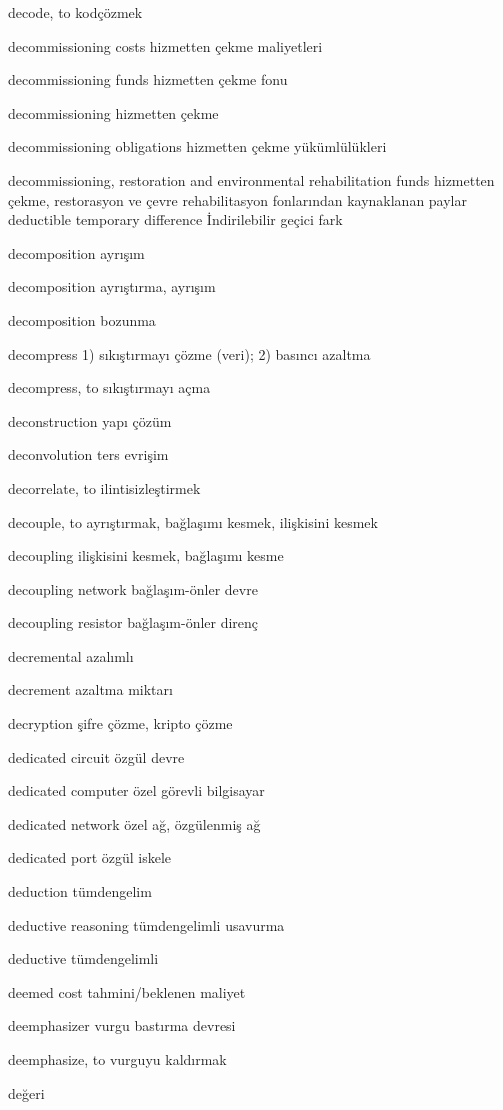 \documentclass[12pt,fleqn]{article}\usepackage{../../common}
\begin{document}
decode, to kodçözmek

decommissioning costs hizmetten çekme maliyetleri

decommissioning funds hizmetten çekme fonu

decommissioning hizmetten çekme

decommissioning obligations hizmetten çekme yükümlülükleri

decommissioning, restoration and environmental rehabilitation funds hizmetten çekme, restorasyon ve çevre rehabilitasyon fonlarından kaynaklanan paylar deductible temporary difference İndirilebilir geçici fark

decomposition ayrışım

decomposition ayrıştırma, ayrışım

decomposition bozunma

decompress 1) sıkıştırmayı çözme (veri); 2) basıncı azaltma

decompress, to sıkıştırmayı açma

deconstruction yapı çözüm

deconvolution ters evrişim

decorrelate, to ilintisizleştirmek

decouple, to ayrıştırmak, bağlaşımı kesmek, ilişkisini kesmek

decoupling ilişkisini kesmek, bağlaşımı kesme

decoupling network bağlaşım-önler devre

decoupling resistor bağlaşım-önler direnç

decremental azalımlı

decrement azaltma miktarı

decryption şifre çözme, kripto çözme

dedicated circuit özgül devre

dedicated computer özel görevli bilgisayar

dedicated network özel ağ, özgülenmiş ağ

dedicated port özgül iskele

deduction tümdengelim

deductive reasoning tümdengelimli usavurma

deductive tümdengelimli

deemed cost tahmini/beklenen maliyet

deemphasizer vurgu bastırma devresi

deemphasize, to vurguyu kaldırmak

değeri
\end{document}
